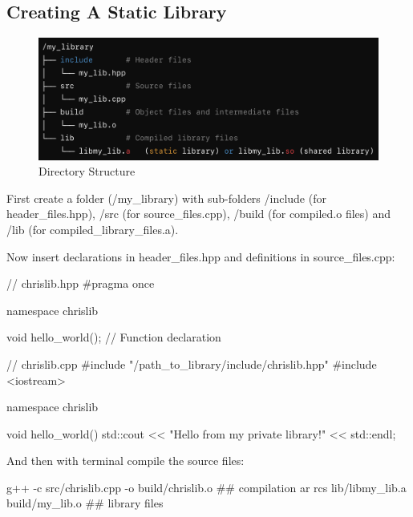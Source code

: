 \subsection*{Creating A Static Library}

\begin{figure}[H]
    \centering
    \includegraphics[width=\textwidth]{assets/library_directory.png}
    \caption{Directory Structure}
\end{figure}

First create a folder (/my\_library) with sub-folders /include (for header\_files.hpp), /src (for source\_files.cpp), /build (for compiled.o files) and /lib (for compiled\_library\_files.a).

Now insert declarations in header\_files.hpp and definitions in source\_files.cpp:

\begin{codeblock}[language=C++]
    // chrislib.hpp
    #pragma once
    
    namespace chrislib {
    
        void hello_world();  // Function declaration
    
    }
\end{codeblock}

\begin{codeblock}[language=C++]
    // chrislib.cpp
    #include "/path_to_library/include/chrislib.hpp"
    #include <iostream>
    
    namespace chrislib {
    
        void hello_world() {
            std::cout << "Hello from my private library!" << std::endl;
        }
    
    }
\end{codeblock}


And then with terminal compile the source files:

\begin{codeblock}[language=bash]
g++ -c src/chrislib.cpp -o build/chrislib.o   ## compilation
ar rcs lib/libmy_lib.a build/my_lib.o   ## library files
\end{codeblock}

